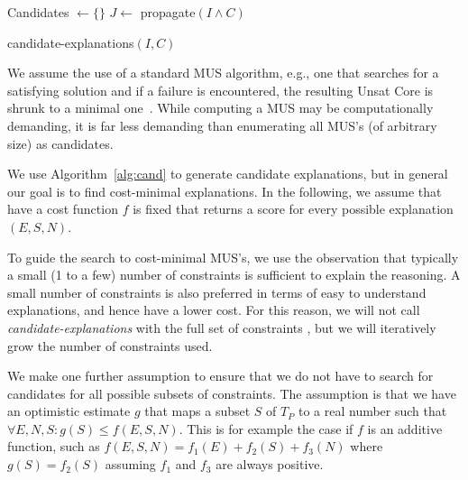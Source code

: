 \begin{algorithm}


  Candidates $\gets \{\}$\;
  $J \gets$ propagate$(I \wedge C)$\;
  \caption{candidate-explanations$(I,C)$}

  \label{alg:cand}
\end{algorithm}

We assume the use of a standard MUS algorithm, e.g., one that searches for a satisfying solution and if a failure is encountered, the resulting Unsat Core is shrunk to a minimal one~\cite{marques2010minimal}. While computing a MUS may be computationally demanding, it is far less demanding than enumerating all MUS's (of arbitrary size) as candidates.

We use Algorithm~\ref{alg:cand} to generate candidate explanations, but in general our goal is to find cost-minimal explanations. In the following, we assume that have a cost function $f$ is fixed that returns a score for every possible explanation $(E, S, N)$.

To guide the search to cost-minimal MUS's, we use the observation that typically a small (1 to a few) number of constraints is sufficient to explain the reasoning. A small number of constraints is also preferred in terms of easy to understand explanations, and hence have a lower cost. For this reason, we will  not call \textit{candidate-explanations} with the full set of constraints \allconstraints, but we will iteratively grow the number of constraints used.

We make one further assumption to ensure that we do not have to search for candidates for all possible subsets of constraints. The assumption is that we have an optimistic estimate $g$ that maps a subset $S$ of $T_P$ to a real number such that  $\forall E, N, S: g(S) \leq f(E, S, N)$. This is for example the case if $f$ is an additive function, such as $f(E, S, N) = f_1(E) + f_2(S) + f_3(N)$ where $g(S) = f_2(S)$ assuming $f_1$ and $f_3$ are always positive.

